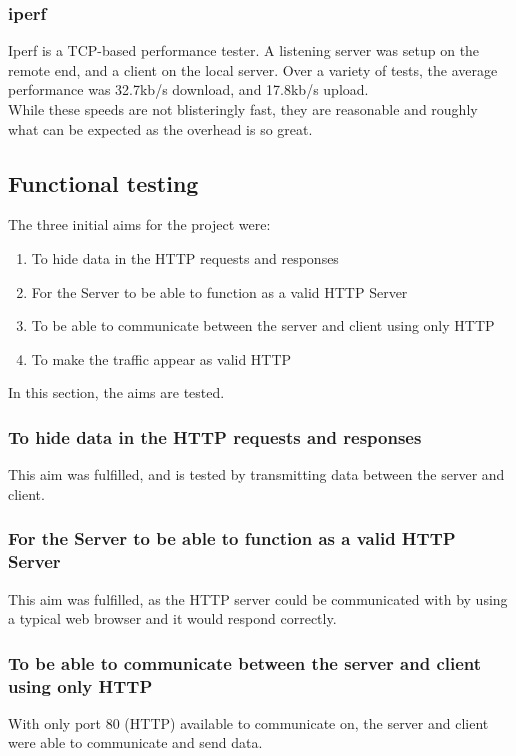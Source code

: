 \subsubsection{iperf}
Iperf is a TCP-based performance tester.
A listening server was setup on the remote end, and a client on the local server.
Over a variety of tests, the average performance was 32.7kb/s download, and 17.8kb/s upload.\\
While these speeds are not blisteringly fast, they are reasonable and roughly what can be expected as the overhead is so great.

\subsection{Functional testing}
The three initial aims for the project were:
\begin{enumerate}
    \item To hide data in the HTTP requests and responses
    \item For the Server to be able to function as a valid HTTP Server
    \item To be able to communicate between the server and client using only HTTP
    \item To make the traffic appear as valid HTTP
\end{enumerate}
In this section, the aims are tested.
\subsubsection{To hide data in the HTTP requests and responses}
This aim was fulfilled, and is tested by transmitting data between the server and client.

\subsubsection{For the Server to be able to function as a valid HTTP Server}
This aim was fulfilled, as the HTTP server could be communicated with by using a typical web browser and it would respond correctly.

\subsubsection{To be able to communicate between the server and client using only HTTP}
With only port 80 (HTTP) available to communicate on, the server and client were able to communicate and send data.

